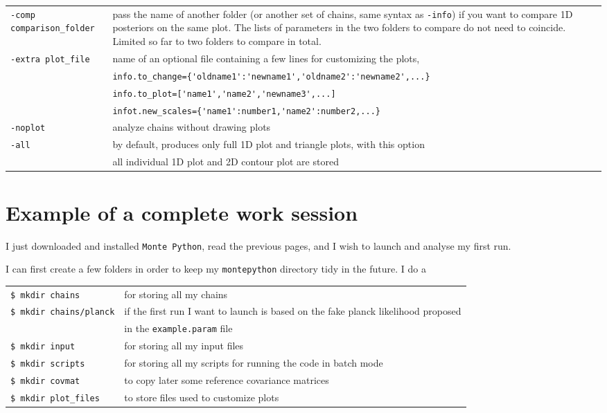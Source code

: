 \documentclass[10pt]{article}
\newcommand{\MP}{\texttt{Monte Python}}
\begin{document}
\begin{itemize}
\begin{tabular}{ll}
\verb?-comp comparison_folder? & pass the name of another folder (or another set of chains, same syntax as \verb?-info?) if you want to compare 1D posteriors on the same plot. The lists of parameters in the two folders to compare do not need to coincide. Limited so far to two folders to compare in total.\\
\verb?-extra plot_file? & name of an optional file containing a few lines for customizing the plots,\\& \verb?info.to_change={'oldname1':'newname1','oldname2':'newname2',...}?\\&
\verb?info.to_plot=['name1','name2','newname3',...]?\\& 
\verb?infot.new_scales={'name1':number1,'name2':number2,...}?\\
\verb?-noplot? & analyze chains without drawing plots \\
\verb?-all? & by default, produces only full 1D plot and triangle plots, with this option\\& all individual 1D plot and 2D contour plot are stored 
\end{tabular}
\end{itemize}

\section{Example of a complete work session}

I just downloaded and installed \MP, read the previous pages, and I wish to launch and analyse my first run.

I can first create a few folders in order to keep my \verb?montepython? directory tidy in the future. I do a \\
\begin{tabular}{ll}
\verb?$ mkdir chains? &for storing all my chains\\
\verb?$ mkdir chains/planck?& if the first run I want to launch is based on the fake planck likelihood proposed\\& in the \verb?example.param? file\\
\verb?$ mkdir input?& for storing all my input files\\
\verb?$ mkdir scripts?& for storing all my scripts for running the code in batch mode\\
\verb?$ mkdir covmat?&to copy later some reference covariance matrices\\
\verb?$ mkdir plot_files?&to store files used to customize plots
\end{tabular}\\
\end{document}
